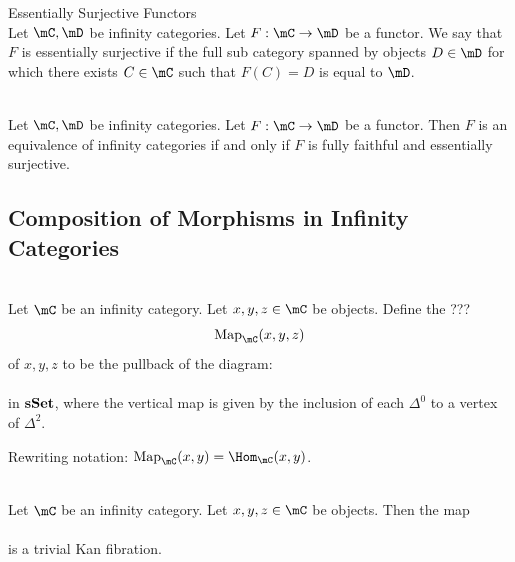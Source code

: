 \documentclass[a4paper]{article}
\begin{document}
\begin{defn}{Essentially Surjective Functors}{}\\ Let $\mC,\mD$ be infinity categories. Let $F:\mC\to\mD$ be a functor. We say that $F$ is essentially surjective if the full sub category spanned by objects $D\in\mD$ for which there exists $C\in\mC$ such that $F(C)=D$ is equal to $\mD$. 
\end{defn}

\begin{prp}{}{}\\ Let $\mC,\mD$ be infinity categories. Let $F:\mC\to\mD$ be a functor. Then $F$ is an equivalence of infinity categories if and only if $F$ is fully faithful and essentially surjective. 
\end{prp}

\subsection{Composition of Morphisms in Infinity Categories}
\begin{defn}{}{}\\ Let $\mC$ be an infinity category. Let $x,y,z\in\mC$ be objects. Define the ??? $$\text{Map}_\mC(x,y,z)$$ of $x,y,z$ to be the pullback of the diagram: \\
\\
in $\bold{sSet}$, where the vertical map is given by the inclusion of each $\Delta^0$ to a vertex of $\Delta^2$. 
\end{defn}

Rewriting notation: $\text{Map}_\mC(x,y)=\Hom_\mC(x,y)$. 

\begin{lmm}{}{}\\ Let $\mC$ be an infinity category. Let $x,y,z\in\mC$ be objects. Then the map \\
\\
is a trivial Kan fibration. 
\end{lmm}
\end{document}
